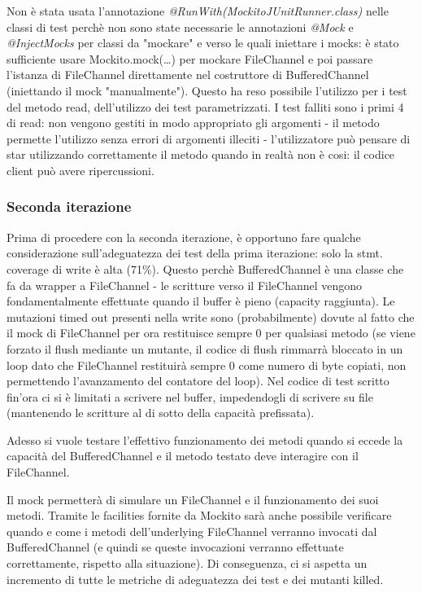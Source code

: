\documentclass[10pt, a4paper]{article}
\begin{document}
	Non è stata usata l'annotazione \textit{@RunWith(MockitoJUnitRunner.class)} nelle classi di test perchè
	non sono state necessarie le annotazioni \textit{@Mock} e \textit{@InjectMocks} per classi da "mockare" e
	verso le quali iniettare i mocks: è stato sufficiente usare Mockito.mock(\dots) per mockare FileChannel e poi
	passare l'istanza di FileChannel direttamente nel costruttore di BufferedChannel 
	(iniettando il mock "manualmente"). 
	Questo ha reso possibile l'utilizzo per i test del metodo read, dell'utilizzo dei test parametrizzati.
	I test falliti sono i primi 4 di read: non vengono gestiti in modo appropriato gli argomenti - il metodo
	permette l'utilizzo senza errori di argomenti illeciti - l'utilizzatore può pensare di star utilizzando
	correttamente il metodo quando in realtà non è cosi: il codice client può avere ripercussioni.
	
	\subsubsection{Seconda iterazione}
	Prima di procedere con la seconda iterazione, è opportuno fare qualche considerazione sull'adeguatezza
	dei test della prima iterazione: solo la stmt. coverage di write è alta (71\%). Questo perchè BufferedChannel
	è una classe che fa da wrapper a FileChannel - le scritture verso il FileChannel vengono fondamentalmente
	effettuate quando il buffer è pieno (capacity raggiunta). Le mutazioni timed out presenti nella write
	sono (probabilmente) 
	dovute al fatto che il mock di FileChannel per ora restituisce sempre 0 per qualsiasi metodo (se viene
	forzato il flush mediante un mutante, il codice di flush rimmarrà bloccato in un loop dato che FileChannel
	restituirà sempre 0 come numero di byte copiati, non permettendo l'avanzamento del contatore del loop).
	Nel codice di test scritto fin'ora ci si è limitati a scrivere nel buffer, impedendogli di scrivere su file
	(mantenendo le scritture al di sotto della capacità prefissata).
	
	Adesso si vuole testare l'effettivo funzionamento dei metodi quando si eccede la capacità del BufferedChannel
	e il metodo testato deve interagire con il FileChannel.
	
	Il mock permetterà di simulare un FileChannel e il funzionamento
	dei suoi metodi. Tramite le facilities fornite da Mockito sarà anche possibile verificare quando e come i
	metodi dell'underlying FileChannel verranno invocati dal BufferedChannel (e quindi se queste invocazioni
	verranno effettuate correttamente, rispetto alla situazione).
	Di conseguenza, ci si aspetta un incremento di tutte le metriche di adeguatezza dei test e dei mutanti killed.
	
\end{document}

